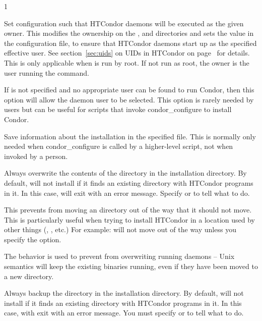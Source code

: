 \begin{ManPage}{\label{man-condor-configure}}{1}
\begin{Options}
   {Set configuration
    such that HTCondor daemons will be executed as the given owner.
    This modifies the 
    ownership on the ,  and 
    directories and sets the  value
    in the configuration file,
    to ensure that HTCondor daemons start up as the specified effective user.
    See section~\ref{sec:uids} on
    UIDs in HTCondor on page~\pageref{sec:uids} for details.
    This is only applicable when  is run by root.
    If not run as root, the owner is the user running
    the  command.  }

   {If  is not specified and
    no appropriate user can be found to run Condor, then this option
    will allow the daemon user to be selected. This option is rarely
    needed by users but can be useful for scripts that invoke
    condor\_configure to install Condor.}

   {Save information about the
    installation in the specified file. This is normally only needed
    when condor\_configure is called by a higher-level script, not when
    invoked by a person.}

   {
    Always overwrite the contents of the  directory in
    the installation directory.  By default, 
    will not install if it finds an existing  directory
    with HTCondor programs in it.  In this case, 
    will exit with an error message.  Specify
     or  to tell 
    what to do.

    This prevents  from moving an 
    directory out of the way that it should not move.  This is
    particularly useful when trying to install HTCondor in a
    location used by other things (, , etc.)
    For example:  
         will not move
     out of the way unless you specify the
     option.

    The  behavior is used to
    prevent  from overwriting running daemons --
    Unix semantics will keep the existing binaries running, even
    if they have been moved to a new directory.}

   {
    Always backup the  directory in the installation
    directory.  By default,  will not install if
    it finds an existing  directory with HTCondor programs
    in it.  In this case,  with exit with an
    error message.  You must specify  or
     to tell  what to do.

}
\end{Options}
\end{ManPage}
